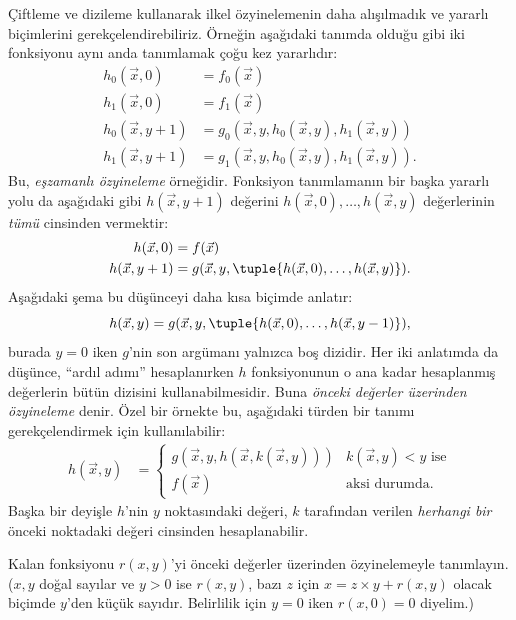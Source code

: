 


Çiftleme ve dizileme kullanarak ilkel özyinelemenin daha alışılmadık ve
yararlı biçimlerini gerekçelendirebiliriz. Örneğin aşağıdaki tanımda olduğu
gibi iki fonksiyonu aynı anda tanımlamak çoğu kez yararlıdır:
\begin{align*}
  h_0(\vec x,0) & = f_0(\vec x)\\
  h_1(\vec x,0) & = f_1(\vec x)\\
  h_0(\vec x,y+1) & =
    g_0(\vec x,y,h_0(\vec x,y),h_1(\vec x,y))\\
  h_1(\vec x,y+1) & =
    g_1(\vec x,y,h_0(\vec x,y),h_1(\vec x,y)).
\end{align*}
Bu, \emph{eşzamanlı özyineleme} örneğidir. Fonksiyon tanımlamanın bir başka
yararlı yolu da aşağıdaki gibi $h(\vec x,y+1)$ değerini
$h(\vec x,0),\dots,h(\vec x,y)$ değerlerinin \emph{tümü} cinsinden vermektir:
\begin{align*}
  h(\vec x,0) & = f(\vec x)\\
  h(\vec x,y+1) & =
    g(\vec x,y,\tuple{h(\vec x,0),\dots,h(\vec x,y)}).
\end{align*}
Aşağıdaki şema bu düşünceyi daha kısa biçimde anlatır:
\[
  h(\vec x,y)=
  g(\vec x,y,\tuple{h(\vec x,0),\dots,h(\vec x,y-1)}),
\]
burada $y=0$ iken $g$'nin son argümanı yalnızca boş dizidir. Her iki
anlatımda da düşünce, ``ardıl adımı'' hesaplanırken $h$ fonksiyonunun o ana
kadar hesaplanmış değerlerin bütün dizisini kullanabilmesidir. Buna
\emph{önceki değerler üzerinden özyineleme} denir. Özel bir örnekte bu,
aşağıdaki türden bir tanımı gerekçelendirmek için kullanılabilir:
\begin{align*}
  h(\vec x,y) & = \begin{cases}
    g(\vec x,y,h(\vec x,k(\vec x,y))) & \text{$k(\vec x,y)<y$ ise}\\
    f(\vec x) & \text{aksi durumda.}
  \end{cases}
\end{align*}
Başka bir deyişle $h$'nin $y$ noktasındaki değeri, $k$ tarafından verilen
\emph{herhangi bir} önceki noktadaki değeri cinsinden hesaplanabilir.

\begin{prob}
  Kalan fonksiyonu $r(x,y)$'yi önceki değerler üzerinden özyinelemeyle
  tanımlayın. ($x,y$ doğal sayılar ve $y>0$ ise $r(x,y)$, bazı $z$ için
  $x=z\times y+r(x,y)$ olacak biçimde $y$'den küçük sayıdır. Belirlilik için
  $y=0$ iken $r(x,0)=0$ diyelim.)
\end{prob}

